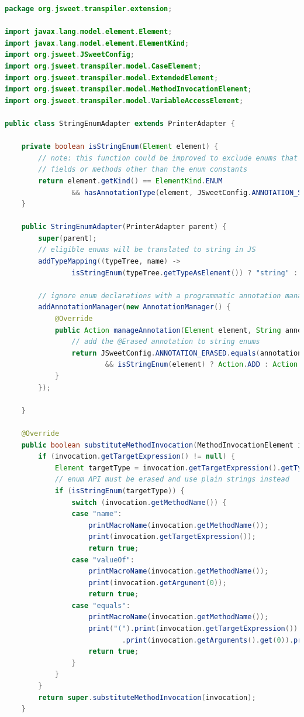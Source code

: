 \documentclass[a4paper]{report}
\begin{document}
\begin{lstlisting}[language=Java]
package org.jsweet.transpiler.extension;

import javax.lang.model.element.Element;
import javax.lang.model.element.ElementKind;
import org.jsweet.JSweetConfig;
import org.jsweet.transpiler.model.CaseElement;
import org.jsweet.transpiler.model.ExtendedElement;
import org.jsweet.transpiler.model.MethodInvocationElement;
import org.jsweet.transpiler.model.VariableAccessElement;

public class StringEnumAdapter extends PrinterAdapter {

	private boolean isStringEnum(Element element) {
		// note: this function could be improved to exclude enums that have
		// fields or methods other than the enum constants
		return element.getKind() == ElementKind.ENUM 
				&& hasAnnotationType(element, JSweetConfig.ANNOTATION_STRING_TYPE);
	}

	public StringEnumAdapter(PrinterAdapter parent) {
		super(parent);
		// eligible enums will be translated to string in JS
		addTypeMapping((typeTree, name) -> 
				isStringEnum(typeTree.getTypeAsElement()) ? "string" : null);

		// ignore enum declarations with a programmatic annotation manager
		addAnnotationManager(new AnnotationManager() {
			@Override
			public Action manageAnnotation(Element element, String annotationType) {
				// add the @Erased annotation to string enums
				return JSweetConfig.ANNOTATION_ERASED.equals(annotationType) 
						&& isStringEnum(element) ? Action.ADD : Action.VOID;
			}
		});

	}

	@Override
	public boolean substituteMethodInvocation(MethodInvocationElement invocation) {
		if (invocation.getTargetExpression() != null) {
			Element targetType = invocation.getTargetExpression().getTypeAsElement();
			// enum API must be erased and use plain strings instead
			if (isStringEnum(targetType)) {
				switch (invocation.getMethodName()) {
				case "name":
					printMacroName(invocation.getMethodName());
					print(invocation.getTargetExpression());
					return true;
				case "valueOf":
					printMacroName(invocation.getMethodName());
					print(invocation.getArgument(0));
					return true;
				case "equals":
					printMacroName(invocation.getMethodName());
					print("(").print(invocation.getTargetExpression()).print(" == ")
							.print(invocation.getArguments().get(0)).print(")");
					return true;
				}
			}
		}
		return super.substituteMethodInvocation(invocation);
	}


\end{lstlisting}
\end{document}
